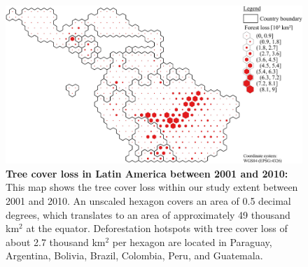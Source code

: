 			\begin{figure}[ht]
				\centering
				\includegraphics[scale=.91]{img/americas_loss_frameless}
				\caption[Tree cover loss in Latin America between 2001 and 2010]{\textbf{Tree cover loss in Latin America between 2001 and 2010:} This map shows the tree cover loss within our study extent between 2001 and 2010. An unscaled hexagon covers an area of 0.5 decimal degrees, which translates to an area of approximately 49 thousand km$^2$ at the equator. Deforestation hotspots with tree cover loss of about 2.7 thousand km$^2$ per hexagon are located in Paraguay, Argentina, Bolivia, Brazil, Colombia, Peru, and Guatemala.}
				\label{fig:americas_loss}
			\end{figure}

